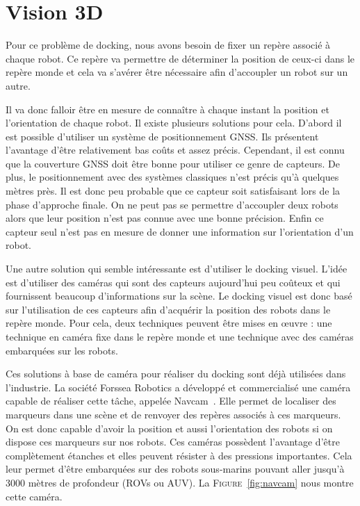 \section{Vision 3D}
    Pour ce problème de docking, nous avons besoin de fixer un repère associé à chaque robot. Ce repère va permettre de déterminer la position de ceux-ci dans le repère monde et cela va s’avérer être nécessaire afin d’accoupler un robot sur un autre.

    Il va donc falloir être en mesure de connaître à chaque instant la position et l’orientation de chaque robot. Il existe plusieurs solutions pour cela. D’abord il est possible d’utiliser un système de positionnement GNSS. Ils présentent l’avantage d’être relativement bas coûts et assez précis. Cependant, il est connu que la couverture GNSS doit être bonne pour utiliser ce genre de capteurs. De plus, le positionnement avec des systèmes classiques n’est précis qu’à quelques mètres près. Il est donc peu probable que ce capteur soit satisfaisant lors de la phase d’approche finale. On ne peut pas se permettre d’accoupler deux robots alors que leur position n’est pas connue avec une bonne précision. Enfin ce capteur seul n’est pas en mesure de donner une information sur l’orientation d’un robot.

    Une autre solution qui semble intéressante est d’utiliser le docking visuel. L’idée est d’utiliser des caméras qui sont des capteurs aujourd’hui peu coûteux et qui fournissent beaucoup d’informations sur la scène. Le docking visuel est donc basé sur l’utilisation de ces capteurs afin d’acquérir la position des robots dans le repère monde. Pour cela, deux techniques peuvent être mises en œuvre : une technique en caméra fixe dans le repère monde et une technique avec des caméras embarquées sur les robots.

    Ces solutions à base de caméra pour réaliser du docking sont déjà utilisées dans l’industrie. La société Forssea Robotics a développé et commercialisé une caméra capable de réaliser cette tâche, appelée Navcam~\cite{forssea}. Elle permet de localiser des marqueurs dans une scène et de renvoyer des repères associés à ces marqueurs. On est donc capable d’avoir la position et aussi l’orientation des robots si on dispose ces marqueurs sur nos robots. Ces caméras possèdent l’avantage d’être complètement étanches et elles peuvent résister à des pressions importantes. Cela leur permet d’être embarquées sur des robots sous-marins pouvant aller jusqu’à 3000 mètres de profondeur (ROVs ou AUV). La \textsc{Figure}~\ref{fig:navcam} nous montre cette caméra.

